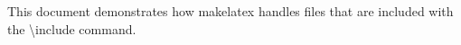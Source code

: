 \documentclass[letterpaper,12pt]{article}
\begin{document}
This document demonstrates how makelatex handles files that are included with the \textbackslash{}include command.



\lipsum[1-3]
\end{document}
